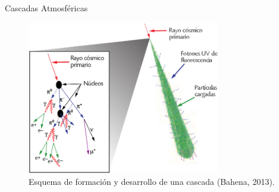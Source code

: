 \documentclass[10pt,xcolor=table]{beamer}
\begin{document}
%		

\begin{frame}{Cascadas Atmosf\'ericas}
	\begin{figure}
	\centering
	\includegraphics[width=0.75\textwidth]{Figuras/air_shower} 
	\caption{Esquema de formación y desarrollo de una cascada (Bahena, 2013).}
	\label{fig:airshower}
	\end{figure}	
\end{frame}	
	
\end{document}
